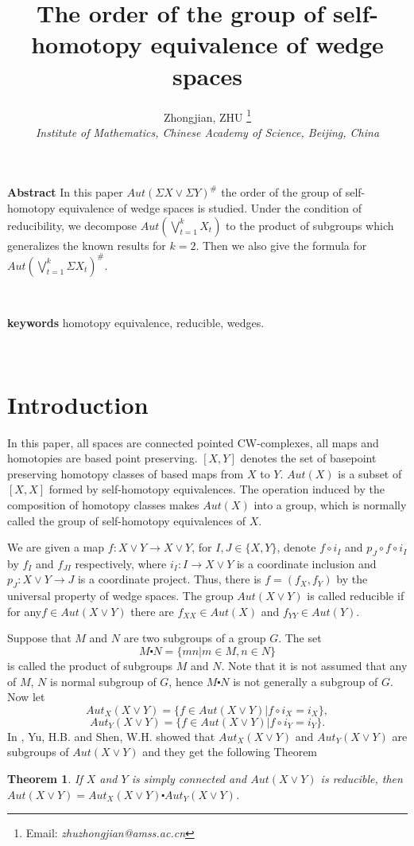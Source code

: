 \documentclass[12pt]{article}
\title{\textbf{The order of the group of self-homotopy equivalence of wedge spaces}}
\author{\Large Zhongjian, ZHU
\footnote{Email: \emph{zhuzhongjian@amss.ac.cn}}  \\
\normalsize \em{Institute of Mathematics, Chinese Academy of Science, Beijing, China}}
\date{}
\theoremstyle{theorem}
\newtheorem{theorem}{Theorem}[section]
\theoremstyle{definition}
\theoremstyle{proposition}
\theoremstyle{corollary}
\theoremstyle{lemma}
\theoremstyle{remark}
\theoremstyle{example}
\begin{document}
\maketitle
{\noindent\small{\bf{Abstract}}\quad
In this paper $Aut(\Sigma X\vee \Sigma Y)^\#$ the order of the group of self-homotopy equivalence of wedge spaces is studied. Under the condition of reducibility,  we decompose $ Aut(\bigvee\limits_{t=1}^{k}X_{t})$ to the product of subgroups which generalizes the known results for $k=2$. Then we also give the formula for $ Aut(\bigvee\limits_{t=1}^{k}\Sigma X_{t})^{\#}$.

\

{\noindent\small{\bf{keywords}}\quad
  homotopy equivalence, reducible, wedges.}

\
\

\section{Introduction}
\label{intro}
 In this paper, all spaces are connected pointed CW-complexes, all maps and homotopies are based point preserving. $[X,Y]$ denotes the set of basepoint preserving homotopy classes of based maps from $X$ to $Y$. $Aut(X)$ is a subset of $[X,X]$ formed by self-homotopy equivalences. The operation induced by the composition of homotopy classes
makes $Aut(X)$  into a group, which is normally called the group of self-homotopy equivalences of $X$.

 We are given a map $f: X\vee Y\rightarrow X\vee Y$, for $I,J\in \{X,Y\}$, denote $f{\ensuremath{{\scriptstyle\circ}}} i_{I}$ and $p_{J}{\ensuremath{{\scriptstyle\circ}}} f{\ensuremath{{\scriptstyle\circ}}} i_{I}$ by $f_{I}$ and $f_{JI}$ respectively, where $i_{I}: I\rightarrow X\vee Y$ is a coordinate inclusion and $p_{J}:  X\vee Y\rightarrow J $  is a coordinate project. Thus,
there is $f=(f_{X},f_{Y})$ by the universal property of wedge spaces. The group $Aut(X\vee Y)$ is
called reducible if for any$f\in Aut(X\vee Y)$ there are $f_{XX}\in Aut(X)$ and $f_{YY}\in Aut(Y)$.

Suppose that $M$ and $N$ are two subgroups of a group $G$. The set
  $$M\centerdot N=\{mn | m\in M, n\in N\}$$ is called the product of subgroups $M$ and $N$. Note that it is not assumed that any of $M$, $N$ is normal subgroup of $G$, hence $M\centerdot N$ is not generally a subgroup of $G$. Now let
  $$Aut_{X}(X\vee Y)=\{f\in Aut(X\vee Y)| f{\ensuremath{{\scriptstyle\circ}}} i_{X}=i_{X}\},$$
  $$Aut_{Y}(X\vee Y)=\{f\in Aut(X\vee Y)| f{\ensuremath{{\scriptstyle\circ}}} i_{Y}=i_{Y}\}.$$
 In \cite{YS1}, Yu, H.B. and Shen, W.H. showed that  $Aut_{X}(X\vee Y)$ and $Aut_{Y}(X\vee Y)$ are subgroups of $Aut(X\vee Y)$ and they get
 the following Theorem
 \begin{theorem} \label{theorem 1.1}
  If $X$ and $Y$ is simply connected and $Aut(X\vee Y)$ is reducible, then $Aut(X\vee Y)= Aut_{X}(X\vee Y)\centerdot  Aut_{Y}(X\vee Y) $.
 \end{theorem}

}
\end{document}
